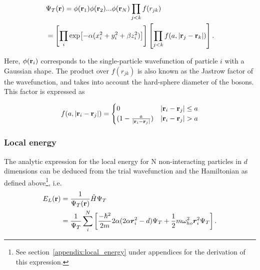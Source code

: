 \documentclass[
    a4paper, aps, twocolumn, floatfix, superscriptaddress,
    nofootinbib]{revtex4-1}
\begin{document}
\begin{align}
    &\Psi_T(\bold r) = \phi(\bold r_1)\phi(\bold r_2)...\phi(\bold r_N) \prod_{j<k}f(r_{jk}) \label{eq:trial_wavefunction_total}\\
    &= \left[\prod_i\exp[-\alpha(x_i^2 + y_i^2 + \beta z_i^2)]\right]\left[\prod_{j<k}f(a, |\bold r_j - \bold r_k|)\right]. \nonumber
\end{align}

Here, $\phi(\bold r_i)$ corresponds to the single-particle wavefunction of particle $i$ with a Gaussian shape. The product over $f(r_{jk})$ is also known as the Jastrow factor of the wavefunction, and takes into account the hard-sphere diameter of the bosons. This factor is expressed as

\begin{align}
    f(a, |\bold r_i - \bold r_j|) = \begin{cases}
    0 & |\bold r_i - \bold r_j| \leq a \\
    (1-\frac{a}{|\bold r_i - \bold r_j|}) & |\bold r_i - \bold r_j| > a
    \end{cases}
\end{align}

\subsubsection{Local energy} 
The analytic expression for the local energy for N non-interacting particles in $d$ dimensions can be deduced from the trial wavefunction and the Hamiltonian as defined above\footnote{See section~\ref{appendix:local_energy} under appendices for the derivation of this expression.}, i.e.
\begin{align}
    E_L(\bold r) &= \frac{1}{\Psi_T(\bold r)}\hat{H}\Psi_T \label{eq:E_local_analytic}\\
    &= \frac{1}{\Psi_T} \sum_i^N \left[\frac{-\hbar^2}{2m} 2\alpha(2\alpha \boldsymbol{r}_i^2 - d) \Psi_T + \frac{1}{2}m \omega_{ho}^2 \boldsymbol{r}_i^2 \Psi_T\right]. \nonumber
\end{align}
\end{document}
